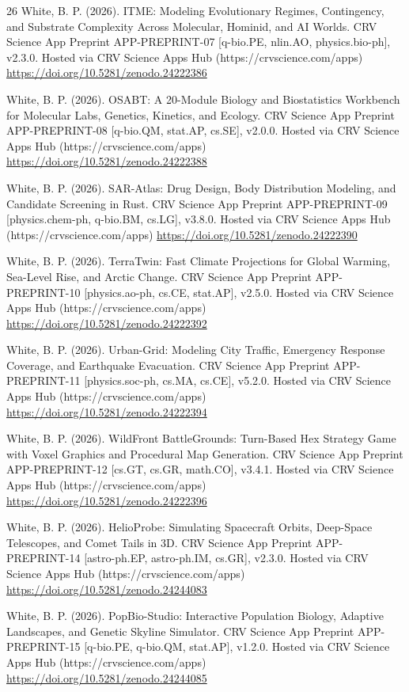 \documentclass[10pt,letterpaper]{article}
\begin{document}
\begin{thebibliography}{26}
 White, B. P. (2026). ITME: Modeling Evolutionary Regimes, Contingency, and Substrate Complexity Across Molecular, Hominid, and AI Worlds. CRV Science App Preprint APP-PREPRINT-07 [q-bio.PE, nlin.AO, physics.bio-ph], v2.3.0. Hosted via CRV Science Apps Hub (https://crvscience.com/apps) \url{https://doi.org/10.5281/zenodo.24222386}

 White, B. P. (2026). OSABT: A 20-Module Biology and Biostatistics Workbench for Molecular Labs, Genetics, Kinetics, and Ecology. CRV Science App Preprint APP-PREPRINT-08 [q-bio.QM, stat.AP, cs.SE], v2.0.0. Hosted via CRV Science Apps Hub (https://crvscience.com/apps) \url{https://doi.org/10.5281/zenodo.24222388}

 White, B. P. (2026). SAR-Atlas: Drug Design, Body Distribution Modeling, and Candidate Screening in Rust. CRV Science App Preprint APP-PREPRINT-09 [physics.chem-ph, q-bio.BM, cs.LG], v3.8.0. Hosted via CRV Science Apps Hub (https://crvscience.com/apps) \url{https://doi.org/10.5281/zenodo.24222390}

 White, B. P. (2026). TerraTwin: Fast Climate Projections for Global Warming, Sea-Level Rise, and Arctic Change. CRV Science App Preprint APP-PREPRINT-10 [physics.ao-ph, cs.CE, stat.AP], v2.5.0. Hosted via CRV Science Apps Hub (https://crvscience.com/apps) \url{https://doi.org/10.5281/zenodo.24222392}

 White, B. P. (2026). Urban-Grid: Modeling City Traffic, Emergency Response Coverage, and Earthquake Evacuation. CRV Science App Preprint APP-PREPRINT-11 [physics.soc-ph, cs.MA, cs.CE], v5.2.0. Hosted via CRV Science Apps Hub (https://crvscience.com/apps) \url{https://doi.org/10.5281/zenodo.24222394}

 White, B. P. (2026). WildFront BattleGrounds: Turn-Based Hex Strategy Game with Voxel Graphics and Procedural Map Generation. CRV Science App Preprint APP-PREPRINT-12 [cs.GT, cs.GR, math.CO], v3.4.1. Hosted via CRV Science Apps Hub (https://crvscience.com/apps) \url{https://doi.org/10.5281/zenodo.24222396}

 White, B. P. (2026). HelioProbe: Simulating Spacecraft Orbits, Deep-Space Telescopes, and Comet Tails in 3D. CRV Science App Preprint APP-PREPRINT-14 [astro-ph.EP, astro-ph.IM, cs.GR], v2.3.0. Hosted via CRV Science Apps Hub (https://crvscience.com/apps) \url{https://doi.org/10.5281/zenodo.24244083}

 White, B. P. (2026). PopBio-Studio: Interactive Population Biology, Adaptive Landscapes, and Genetic Skyline Simulator. CRV Science App Preprint APP-PREPRINT-15 [q-bio.PE, q-bio.QM, stat.AP], v1.2.0. Hosted via CRV Science Apps Hub (https://crvscience.com/apps) \url{https://doi.org/10.5281/zenodo.24244085}


\end{thebibliography}
\end{document}
